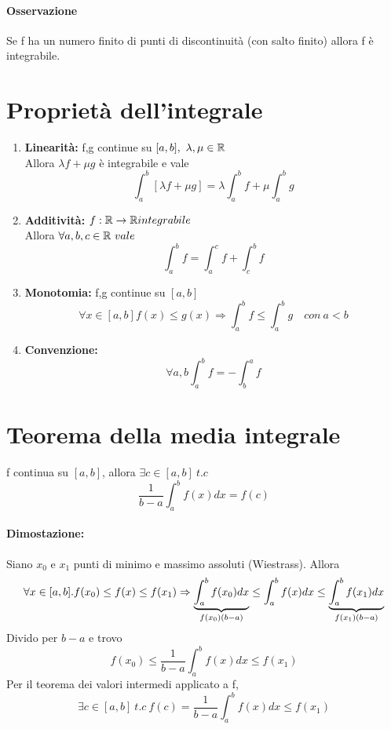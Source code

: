 \documentclass[a4paper]{article}
\begin{document}
\paragraph{Osservazione} Se f ha un numero finito di punti di discontinuità (con salto finito) allora f è integrabile.

\section{Proprietà dell'integrale}

\begin{enumerate}
	\item \textbf{Linearità:} f,g continue su $[a,b],\ \lambda,\mu \in \mathbb{R}$ \\
		Allora $ \lambda f + \mu g $ è integrabile e vale
		$$
		\int_a^b [\lambda f + \mu g] = \lambda \int_a^b f + \mu \int_a^b g
		$$

	\item \textbf{Additività:} $ f: \mathbb{R} \to \mathbb{R} integrabile $ \\ Allora
		$\forall a,b,c \in \mathbb{R} \ vale \\$
		$$\int_a^b f = \int_a^c f + \int_c^b f$$
	\item \textbf{Monotomia:} f,g continue su $[a,b]$ \\
		$$\forall x \in [a,b]  f(x) \le g(x) \Rightarrow
			\int_a^b f \le \int_a^b g \quad con \ a<b
		$$
	\item \textbf{Convenzione:}
		$$
			\forall a,b \int_a^b f = - \int_b^a f
		$$
\end{enumerate}

\section{Teorema della media integrale}
f continua su $[a,b]$, allora $ \exists c \in [a,b] \ t.c $\\
$$
\frac{1}{b-a} \int_a^b f(x) dx = f(c)
$$
\paragraph{Dimostazione:} Siano $x_0$ e $x_1$ punti di minimo e massimo assoluti (Wiestrass). Allora \\
$$ 	\forall x \in [a,b] . f(x_0) \le f(x) \le f(x_1)\\
	\Rightarrow \underbrace{\int_a^b f(x_0) dx}_{f(x_0)(b-a)} \le \int_a^b f(x) dx \le \underbrace{\int_a^b f(x_1) dx}_{f(x_1)(b-a)}
$$
Divido per $b-a$ e trovo
$$
f(x_0) \le \frac {1}{b-a} \int_a^b f(x) dx \le f(x_1)
$$
Per il teorema dei valori intermedi applicato a f, $$ \exists c \in [a,b] \ t.c \ f(c) =\frac{1}{b-a} \int_a^b f(x) dx \le f(x_1)
$$
\end{document}
